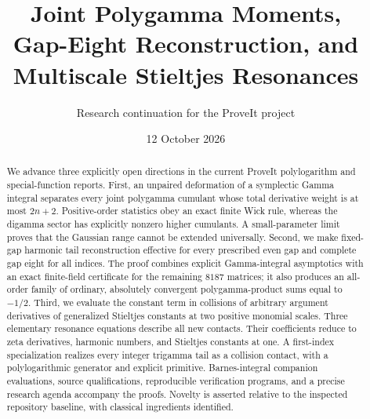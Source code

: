 \documentclass[11pt,a4paper]{article}
\title{\bfseries Joint Polygamma Moments,\\
Gap-Eight Reconstruction, and\\
Multiscale Stieltjes Resonances}
\author{Research continuation for the ProveIt project}
\date{12 October 2026}
\numberwithin{equation}{section}
\theoremstyle{definition}
\theoremstyle{remark}
\begin{document}
\maketitle
\begin{abstract}
We advance three explicitly open directions in the current ProveIt
polylogarithm and special-function reports. First, an unpaired deformation
of a symplectic Gamma integral separates every joint polygamma cumulant
whose total derivative weight is at most $2n+2$. Positive-order statistics
obey an exact finite Wick rule, whereas the digamma sector has explicitly
nonzero higher cumulants. A small-parameter limit proves that the Gaussian
range cannot be extended universally. Second, we make fixed-gap harmonic
tail reconstruction effective for every prescribed even gap and complete
gap eight for all indices. The proof combines explicit Gamma-integral
asymptotics with an exact finite-field certificate for the remaining
$8187$ matrices; it also produces an all-order family of ordinary,
absolutely convergent polygamma-product sums equal to $-1/2$.
Third, we evaluate the constant term in collisions of arbitrary argument
derivatives of generalized Stieltjes constants at two positive monomial
scales. Three elementary resonance equations describe all new contacts.
Their coefficients reduce to zeta derivatives, harmonic numbers, and
Stieltjes constants at one. A first-index specialization realizes every
integer trigamma tail as a collision contact, with a polylogarithmic
generator and explicit primitive. Barnes-integral companion evaluations,
source qualifications, reproducible verification programs, and a precise
research agenda accompany the proofs. Novelty is asserted relative to
the inspected repository baseline, with classical ingredients identified.
\end{abstract}
\tableofcontents
\clearpage









\end{document}
